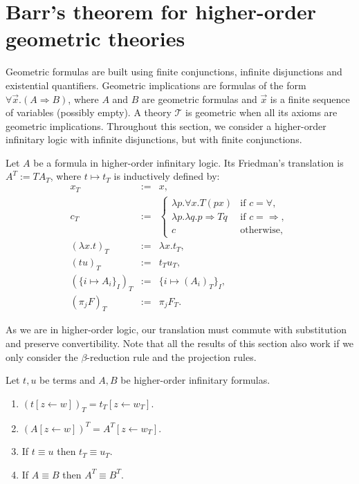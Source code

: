 \section*{Barr's theorem for higher-order geometric theories}
Geometric formulas are built using finite conjunctions, infinite disjunctions and existential quantifiers. Geometric implications are formulas of the form $\forall\vec x.(A\Rightarrow B)$, where $A$ and $B$ are geometric formulas and $\vec x$ is a finite sequence of variables (possibly empty). A theory $\mathcal T$ is geometric when all its axioms are geometric implications. Throughout this section, we consider a higher-order infinitary logic with infinite disjunctions, but with finite conjunctions.
\begin{authordef}
Let $A$ be a formula in higher-order infinitary logic. Its Friedman's translation is $A^T:=TA_T$, where $t\mapsto t_T$ is inductively defined by:
\[\begin{array}{rcl}x_T&:=&x,\\c_T&:=&\begin{cases}\lambda p.\forall x.T(px)&\text{if }c=\forall,\\\lambda p.\lambda q.p\Rightarrow Tq&\text{if }c=\Rightarrow,\\c&\text{otherwise},\end{cases}\\(\lambda x.t)_T&:=&\lambda x.t_T,\\(tu)_T&:=&t_Tu_T,\\(\{i\mapsto A_i\}_I)_T&:=&\{i\mapsto(A_i)_T\}_I,\\(\pi_jF)_T&:=&\pi_jF_T.\end{array}\]
\end{authordef}
As we are in higher-order logic, our translation must commute with substitution and preserve convertibility. Note that all the results of this section also work if we only consider the $\beta$-reduction rule and the projection rules.
\begin{authorprop}[40]
Let $t,u$ be terms and $A,B$ be higher-order infinitary formulas.
\begin{enumerate}\item $(t[z\leftarrow w])_T=t_T[z\leftarrow w_T]$.\item $(A[z\leftarrow w])^T=A^T[z\leftarrow w_T]$.\item If $t\equiv u$ then $t_T\equiv u_T$.\item If $A\equiv B$ then $A^T\equiv B^T$.\end{enumerate}
\end{authorprop}
